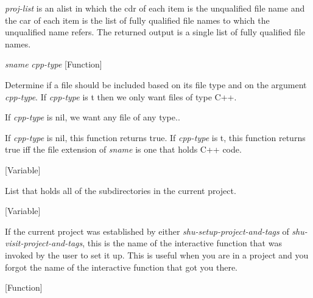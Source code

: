 \begin{doc-string}
\emph{proj-list} is an alist in which the cdr of each item is the unqualified file name
and the car of each item is the list of fully qualified file names to which
the unqualified name refers.  The returned output is a single list of fully
qualified file names.
\end{doc-string}

\vspace{1em}
\noindent
{}
\usebox{\funcname}\emph{sname} \emph{cpp-type}
 \hfill [Function]

\begin{doc-string}
Determine if a file should be included based on its file type and on the
argument \emph{cpp-type}.  If \emph{cpp-type} is t then we only want files of type C++.

If \emph{cpp-type} is nil, we want any file of any type..

If \emph{cpp-type} is nil, this function returns true.  If \emph{cpp-type} is t, this function
returns true iff the file extension of \emph{sname} is one that holds C++ code.
\end{doc-string}

\vspace{1em}
\noindent
{}
\usebox{\funcname}
 \hfill [Variable]

\begin{doc-string}
List that holds all of the subdirectories in the current project.
\end{doc-string}

\vspace{1em}
\noindent
{}
\usebox{\funcname}
 \hfill [Variable]

\begin{doc-string}
If the current project was established by either \emph{shu-setup-project-and-tags}
of \emph{shu-visit-project-and-tags}, this is the name of the interactive function that
was invoked by the user to set it up.  This is useful when you are in a project
and you forgot the name of the interactive function that got you there.
\end{doc-string}

\vspace{1em}
\noindent
{}
\usebox{\funcname}
 \hfill [Function]

